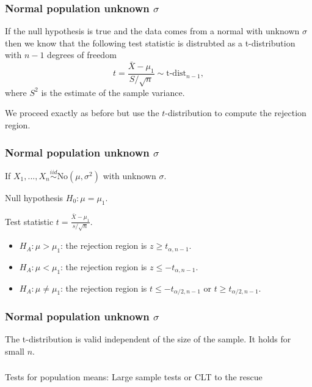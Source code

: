 \begin{frame}[fragile]\frametitle{Normal population unknown $\sigma$}

{\tiny

If the null hypothesis is true and the data comes from
a normal with unknown $\sigma$ then we know that the following
test statistic is distrubted as a t-distribution with $n-1$ 
degrees of freedom
$$t = \frac{\bar{X}-\mu_1}{S/\sqrt{n}} \sim \mbox{t-dist}_{n-1},$$
where $S^2$ is the estimate of the sample variance.

We proceed exactly as before but use the $t$-distribution to
compute the rejection region.

}

\end{frame}



\begin{frame}[fragile]\frametitle{Normal population unknown $\sigma$}

{\tiny

If $X_1,...,X_n \stackrel{iid}{\sim} \mbox{No}(\mu,\sigma^2)$
with unknown $\sigma$.

Null hypothesis $H_0: \mu= \mu_1$.

Test statistic $t = \frac{\bar{X}-\mu_1}{s/\sqrt{n}}.$

\begin{itemize}

\item $H_A: \mu > \mu_1$: the rejection region is $z \geq t_{\alpha,n-1}$.
\item $H_A: \mu < \mu_1$: the rejection region is $z \leq -t_{\alpha,n-1}$.
\item $H_A: \mu \neq \mu_1$: the rejection region is $t \leq
  -t_{\alpha/2,n-1}$ or $t \geq t_{\alpha/2,n-1}$.

\end{itemize}
}

\end{frame}

\begin{frame}[fragile]\frametitle{Normal population unknown $\sigma$}

The t-distribution is valid independent of the size of the
sample. It holds for small $n$.

\end{frame}

\begin{frame}[fragile]\frametitle{}
\begin{center}
{\Large Tests for population means: Large sample tests or CLT to the rescue}

\end{center}
\end{frame}




